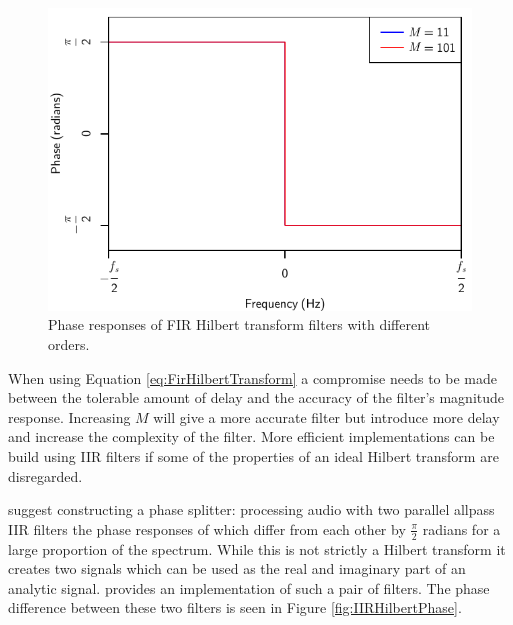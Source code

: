 		\begin{figure}[h!]
			\centering
			\includegraphics{chapter3/Images/HilbertPhaseResponses.pdf}
			\caption{Phase responses of FIR Hilbert transform filters with different orders.}
			\label{fig:HilbertPhase}
		\end{figure}

		When using Equation \ref{eq:FirHilbertTransform} a compromise needs to be made between the tolerable amount
		of delay and the accuracy of the filter's magnitude response. Increasing $M$ will give a more accurate
		filter but introduce more delay and increase the complexity of the filter. More efficient implementations
		can be build using IIR filters if some of the properties of an ideal Hilbert transform are disregarded.

		\citet{oppenheim2014discrete} suggest constructing a phase splitter: processing audio with two parallel
		allpass IIR filters the phase responses of which differ from each other by $\frac{\pi}{2}$ radians for a
		large proportion of the spectrum. While this is not strictly a Hilbert transform it creates two signals
		which can be used as the real and imaginary part of an analytic signal. \citet{niemitalo2003hilbert}
		provides an implementation of such a pair of filters. The phase difference between these two filters is
		seen in Figure \ref{fig:IIRHilbertPhase}.

